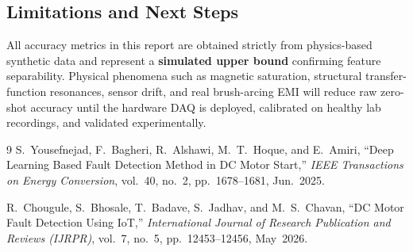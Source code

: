 \documentclass[11pt,a4paper]{article}
\begin{document}
\subsection{Limitations and Next Steps}
All accuracy metrics in this report are obtained strictly from physics-based synthetic data and represent a \textbf{simulated upper bound} confirming feature separability. Physical phenomena such as magnetic saturation, structural transfer-function resonances, sensor drift, and real brush-arcing EMI will reduce raw zero-shot accuracy until the hardware DAQ is deployed, calibrated on healthy lab recordings, and validated experimentally.

\begin{thebibliography}{9}
S.~Yousefnejad, F.~Bagheri, R.~Alshawi, M.~T.~Hoque, and E.~Amiri,
``Deep Learning Based Fault Detection Method in DC Motor Start,''
\emph{IEEE Transactions on Energy Conversion}, vol.~40, no.~2, pp.~1678--1681, Jun.~2025.

R.~Chougule, S.~Bhosale, T.~Badave, S.~Jadhav, and M.~S.~Chavan,
``DC Motor Fault Detection Using IoT,''
\emph{International Journal of Research Publication and Reviews (IJRPR)}, vol.~7, no.~5, pp.~12453--12456, May~2026.
\end{thebibliography}
\end{document}
